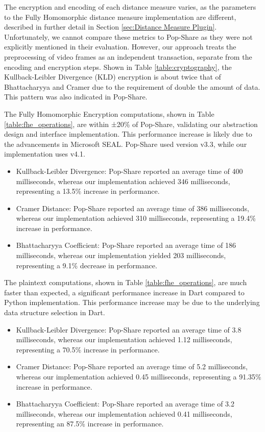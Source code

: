 The encryption and encoding of each distance measure varies, as the parameters to the Fully Homomorphic distance measure implementation are different, described in further detail in Section \ref{sec:Distance Measure Plugin}. Unfortunately, we cannot compare these metrics to Pop-Share as they were not explicitly mentioned in their evaluation. However, our approach treats the preprocessing of video frames as an independent transaction, separate from the encoding and encryption steps. Shown in Table \ref{table:cryptography}, the Kullback-Leibler Divergence (KLD) encryption is about twice that of Bhattacharyya and Cramer due to the requirement of double the amount of data. This pattern was also indicated in Pop-Share.



The Fully Homomorphic Encryption computations, shown in Table \ref{table:fhe_operations}, are within ±20\% of Pop-Share, validating our abstraction design and interface implementation. This performance increase is likely due to the advancements in Microsoft SEAL. Pop-Share used version v3.3, while our implementation uses v4.1.

\begin{itemize}
    \item Kullback-Leibler Divergence: Pop-Share reported an average time of 400 milliseconds, whereas our implementation achieved 346 milliseconds, representing a 13.5\% increase in performance.
    \item Cramer Distance: Pop-Share reported an average time of 386 milliseconds, whereas our implementation achieved 310 milliseconds, representing a 19.4\% increase in performance.
    \item Bhattacharyya Coefficient: Pop-Share reported an average time of 186 milliseconds, whereas our implementation yielded 203 milliseconds, representing a 9.1\% decrease in performance.
\end{itemize}



The plaintext computations, shown in Table \ref{table:fhe_operations}, are much faster than expected, a significant performance increase in Dart compared to Python implementation. This performance increase may be due to the underlying data structure selection in Dart.

\begin{itemize}
    \item Kullback-Leibler Divergence: Pop-Share reported an average time of 3.8 milliseconds, whereas our implementation achieved 1.12 milliseconds, representing a 70.5\% increase in performance.
    \item Cramer Distance: Pop-Share reported an average time of 5.2 milliseconds, whereas our implementation achieved 0.45 milliseconds, representing a 91.35\% increase in performance.
    \item Bhattacharyya Coefficient: Pop-Share reported an average time of 3.2 milliseconds, whereas our implementation achieved 0.41 milliseconds, representing an 87.5\% increase in performance.
\end{itemize}


